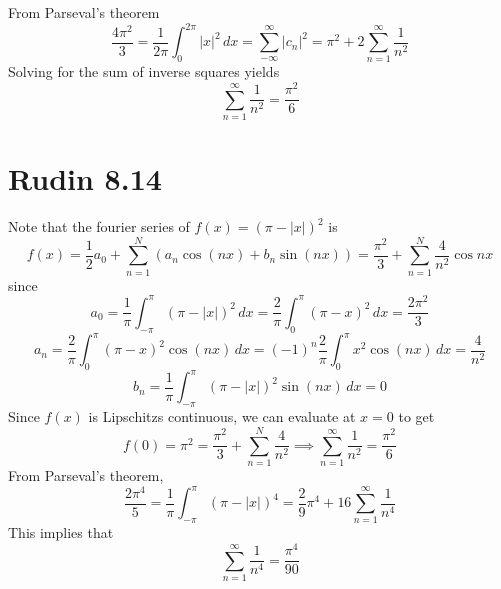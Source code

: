\documentclass{article}
\begin{document}
From Parseval's theorem 
\[
  \frac{4\pi^2}{3}= \frac{1}{2\pi} \int_{0}^{2\pi} |x|^2 \,dx = \sum_{-\infty}^{\infty} |c_n|^2 = \pi^2 + 2\sum_{n=1}^{\infty} \frac{1}{n^2}
\]
Solving for the sum of inverse squares yields 
\[
  \sum_{n=1}^{\infty} \frac{1}{n^2} = \frac{\pi^2}{6}
\]
\newpage 
\section*{Rudin 8.14}
Note that the fourier series of $f(x) = (\pi - |x|)^2$ is 
\[
    f(x) = \frac{1}{2}a_0 + \sum_{n=1}^N(a_n\cos (nx) + b_n \sin (nx))
    = \frac{\pi^2}{3} +  \sum_{n=1}^N \frac{4}{n^2} \cos nx
\]
since 
\[
  a_0 = \frac{1}{\pi} \int_{-\pi}^{\pi} (\pi - |x|)^2\,dx = 
  \frac{2}{\pi} \int_{0}^{\pi} (\pi - x)^2\,dx = \frac{2\pi^2}{3}
\]
\[
  a_n = \frac{2}{\pi} \int_{0}^{\pi} (\pi - x)^2 \cos(nx)\,dx
  = (-1)^n \frac{2}{\pi} \int_{0}^{\pi} x^2 \cos(nx)\,dx
  = \frac{4}{n^2}
\]
\[
  b_n = \frac{1}{\pi} \int_{-\pi}^{\pi} (\pi - |x|)^2 \sin(nx)\,dx
  = 0
\]
Since $f(x)$ is Lipschitzs continuous, we can evaluate at $x=0$ to get 
\[
  f(0) = \pi^2 = \frac{\pi^2}{3} +  \sum_{n=1}^N \frac{4}{n^2} \implies \sum_{n=1}^{\infty} \frac{1}{n^2} = \frac{\pi^2}{6}
\]
From Parseval's theorem,
\[
  \frac{2\pi^4}{5} = \frac{1}{\pi}\int_{-\pi}^{\pi} (\pi - |x|)^4 = \frac{2}{9}\pi^4 + 16\sum_{n=1}^\infty \frac{1}{n^4}
\]
This implies that 
\[
  \sum_{n=1}^\infty \frac{1}{n^4} = \frac{\pi^4}{90}
\]
\end{document}
